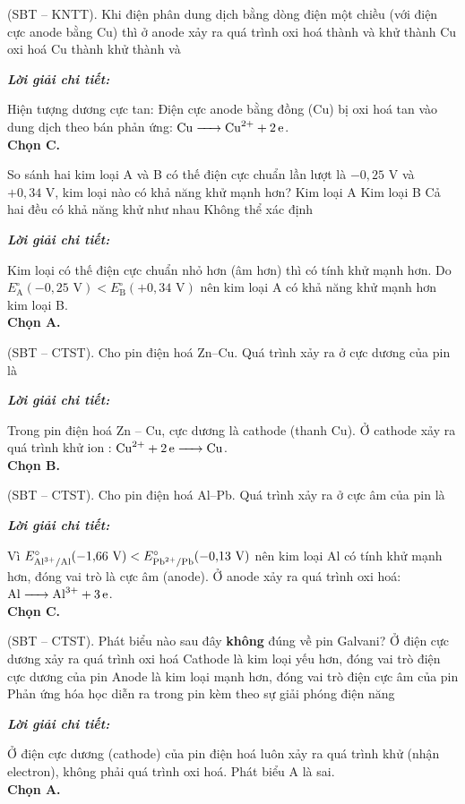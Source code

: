 \documentclass[11pt,a4paper]{article}
\def\loigiai#1{
\par\begingroup\color{blue!80!black}\small
\noindent\textbf{\textit{Lời giải chi tiết:}}\par
#1\par\endgroup}
\begin{document}
\begin{ex}
(SBT – KNTT). Khi điện phân dung dịch  bằng dòng điện một chiều (với điện cực anode bằng Cu) thì ở anode xảy ra quá trình
\choice
{oxi hoá  thành  và }
{khử  thành Cu}
{\True oxi hoá Cu thành }
{khử  thành  và }
\loigiai{
Hiện tượng dương cực tan: Điện cực anode bằng đồng (Cu) bị oxi hoá tan vào dung dịch theo bán phản ứng: $\ce{Cu -> Cu^2+ + 2e}$.\\
\textbf{Chọn C.}}
\end{ex}

\begin{ex}
So sánh hai kim loại A và B có thế điện cực chuẩn lần lượt là $-0{,}25\text{ V}$ và $+0{,}34\text{ V}$, kim loại nào có khả năng khử mạnh hơn?
\choice
{\True Kim loại A}
{Kim loại B}
{Cả hai đều có khả năng khử như nhau}
{Không thể xác định}
\loigiai{
Kim loại có thế điện cực chuẩn nhỏ hơn (âm hơn) thì có tính khử mạnh hơn. Do $E^\circ_{\text{A}} (-0{,}25\text{ V}) < E^\circ_{\text{B}} (+0{,}34\text{ V})$ nên kim loại A có khả năng khử mạnh hơn kim loại B.\\
\textbf{Chọn A.}}
\end{ex}

\begin{ex}
(SBT – CTST). Cho pin điện hoá Zn--Cu. Quá trình xảy ra ở cực dương của pin là
\choice
{}
{\True {}}
{}
{}
\loigiai{
Trong pin điện hoá Zn -- Cu, cực dương là cathode (thanh Cu). Ở cathode xảy ra quá trình khử ion \ce{Cu^2+}: $\ce{Cu^2+ + 2e -> Cu}$.\\
\textbf{Chọn B.}}
\end{ex}

\begin{ex}
(SBT – CTST). Cho pin điện hoá Al--Pb. Quá trình xảy ra ở cực âm của pin là
\choice
{}
{}
{\True {}}
{}
\loigiai{
Vì $E^\circ_{\ce{Al^3+/Al}} (-1{,}66\text{ V}) < E^\circ_{\ce{Pb^2+/Pb}} (-0{,}13\text{ V})$ nên kim loại Al có tính khử mạnh hơn, đóng vai trò là cực âm (anode). Ở anode xảy ra quá trình oxi hoá: $\ce{Al -> Al^3+ + 3e}$.\\
\textbf{Chọn C.}}
\end{ex}



\begin{ex}
(SBT – CTST). Phát biểu nào sau đây \textbf{không} đúng về pin Galvani?
\choice
{\True Ở điện cực dương xảy ra quá trình oxi hoá}
{Cathode là kim loại yếu hơn, đóng vai trò điện cực dương của pin}
{Anode là kim loại mạnh hơn, đóng vai trò điện cực âm của pin}
{Phản ứng hóa học diễn ra trong pin kèm theo sự giải phóng điện năng}
\loigiai{
Ở điện cực dương (cathode) của pin điện hoá luôn xảy ra quá trình khử (nhận electron), không phải quá trình oxi hoá. Phát biểu A là sai.\\
\textbf{Chọn A.}}
\end{ex}
\end{document}
